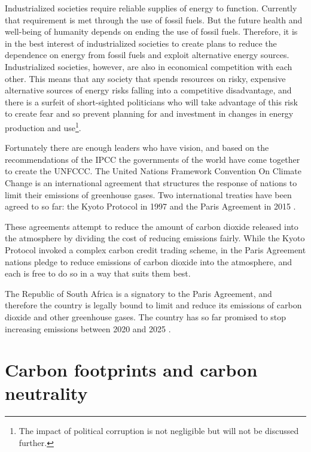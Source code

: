 Industrialized societies require reliable supplies of energy to function.
Currently that requirement is met through the use of fossil fuels. But the
future health and well-being of humanity depends on ending the use of fossil
fuels. Therefore, it is in the best interest of industrialized societies to
create plans to reduce the dependence on energy from fossil fuels and exploit
alternative energy sources. Industrialized societies, however, are also in
economical competition with each other. This means that any society that spends
resources on risky, expensive alternative sources of energy risks falling into a
competitive disadvantage, and there is a surfeit of short-sighted politicians
who will take advantage of this risk to create fear and so prevent planning for
and investment in changes in energy production and use\footnote{The impact of
political corruption is not negligible but will not be discussed further.}.

Fortunately there are enough leaders who have vision, and based on the
recommendations of the IPCC the governments of the world have come together to
create the UNFCCC. The United Nations Framework Convention On Climate Change is
an international agreement that structures the response of nations to limit
their emissions of greenhouse gases. Two international treaties have been agreed
to so far: the Kyoto Protocol in 1997 \autocite{Kyoto1997} and the Paris
Agreement in 2015 \autocite{Paris2015}.

These agreements attempt to reduce the amount of carbon dioxide released into
the atmosphere by dividing the cost of reducing emissions fairly. While the
Kyoto Protocol invoked a complex carbon credit trading scheme, in the Paris
Agreement nations pledge to reduce emissions of carbon dioxide into the
atmosphere, and each is free to do so in a way that suits them best.

The Republic of South Africa is a signatory to the Paris Agreement, and
therefore the country is legally bound to limit and reduce its emissions of
carbon dioxide and other greenhouse gases. The country has so far promised to
stop increasing emissions between 2020 and 2025 \autocite{INDC2016}.


\section{Carbon footprints and carbon neutrality}


